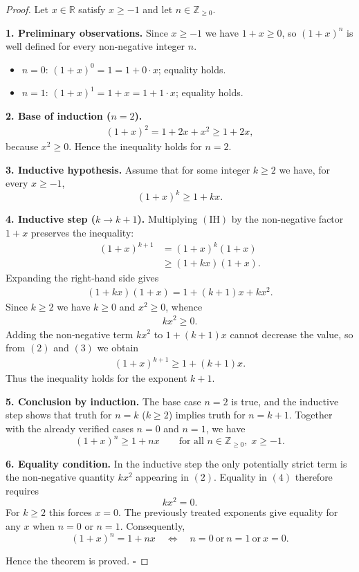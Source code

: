 \begin{proof}
Let \(x\in\mathbb{R}\) satisfy \(x\ge -1\) and let \(n\in\mathbb{Z}_{\ge 0}\).

\medskip\noindent\textbf{1. Preliminary observations.}
Since \(x\ge -1\) we have \(1+x\ge 0\), so \((1+x)^{n}\) is well defined for every
non‑negative integer \(n\).

\begin{itemize}
  \item \(n=0\): \((1+x)^{0}=1=1+0\cdot x\); equality holds.
  \item \(n=1\): \((1+x)^{1}=1+x=1+1\cdot x\); equality holds.
\end{itemize}

\medskip\noindent\textbf{2. Base of induction (\(n=2\)).}
\begin{align*}
(1+x)^{2}=1+2x+x^{2}\ge 1+2x ,
\end{align*}
because \(x^{2}\ge 0\). Hence the inequality holds for \(n=2\).

\medskip\noindent\textbf{3. Inductive hypothesis.}
Assume that for some integer \(k\ge 2\) we have, for every \(x\ge -1\),
\begin{equation}
(1+x)^{k}\ge 1+kx . \tag{IH}
\end{equation}

\medskip\noindent\textbf{4. Inductive step (\(k\to k+1\)).}
Multiplying \((\text{IH})\) by the non‑negative factor \(1+x\) preserves the
inequality:
\begin{align}
(1+x)^{k+1}
   &= (1+x)^{k}(1+x) \\
   &\ge (1+kx)(1+x). \tag{1}
\end{align}
Expanding the right‑hand side gives
\begin{align}
(1+kx)(1+x)=1+(k+1)x+kx^{2}. \tag{2}
\end{align}
Since \(k\ge 2\) we have \(k\ge 0\) and \(x^{2}\ge 0\), whence
\begin{align}
kx^{2}\ge 0. \tag{3}
\end{align}
Adding the non‑negative term \(kx^{2}\) to \(1+(k+1)x\) cannot decrease the
value, so from \((2)\) and \((3)\) we obtain
\begin{align}
(1+x)^{k+1}\ge 1+(k+1)x. \tag{4}
\end{align}
Thus the inequality holds for the exponent \(k+1\).

\medskip\noindent\textbf{5. Conclusion by induction.}
The base case \(n=2\) is true, and the inductive step shows that truth for
\(n=k\) (\(k\ge 2\)) implies truth for \(n=k+1\). Together with the already
verified cases \(n=0\) and \(n=1\), we have
\[
(1+x)^{n}\ge 1+nx\qquad\text{for all }n\in\mathbb{Z}_{\ge 0},\;x\ge -1.
\]

\medskip\noindent\textbf{6. Equality condition.}
In the inductive step the only potentially strict term is the non‑negative
quantity \(kx^{2}\) appearing in \((2)\).  Equality in \((4)\) therefore
requires
\[
kx^{2}=0 .
\]
For \(k\ge 2\) this forces \(x=0\).  The previously treated exponents give
equality for any \(x\) when \(n=0\) or \(n=1\).  Consequently,
\[
(1+x)^{n}=1+nx\quad\Longleftrightarrow\quad n=0\ \text{or}\ n=1\ \text{or}\ x=0 .
\]

Hence the theorem is proved. \(\square\)
\end{proof}